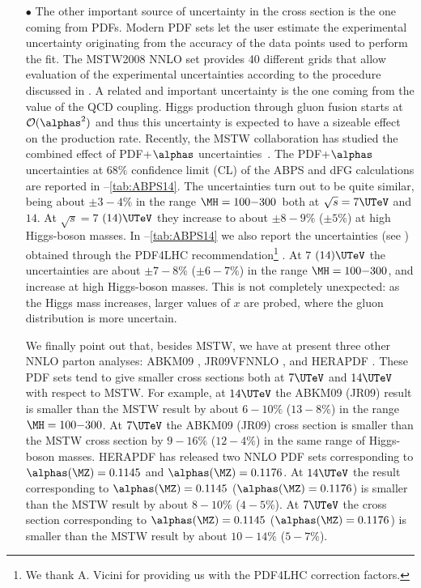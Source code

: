 \begin{itemize}
\item[$\bullet$] The other important source of uncertainty in the cross section is
the one coming from PDFs.
Modern PDF sets let the user estimate the experimental uncertainty
originating from the accuracy of the data points used to perform the fit.
The MSTW2008 NNLO set \cite{Martin:2009iq} provides 40 different grids that allow evaluation of the experimental uncertainties according
to the procedure discussed in .
A related and important uncertainty is the one coming from the value of the QCD coupling.
Higgs production through gluon fusion starts at ${\cal O}(\alphas^2)$ and thus
this uncertainty is expected to have a sizeable effect on the production rate.  
Recently, the MSTW collaboration has studied the combined effect of PDF+$\alphas$
uncertainties~\cite{Martin:2009bu}.
The PDF+$\alphas$ uncertainties at $68\%$ confidence limit (CL) of the ABPS and dFG calculations are
reported in --\ref{tab:ABPS14}.
The uncertainties turn out to be quite similar,
being about $\pm 3{-}4\%$ in the range $\MH=100{-}300$\UGeV\ both at $\sqrt{s}=7\UTeV$ and $14$\UTeV. At $\sqrt{s}=7$ $(14)\UTeV$ they
increase to about $\pm 8{-}9\%$ ($\pm 5\%$) at high Higgs-boson masses.
In --\ref{tab:ABPS14} we also report the
uncertainties (see ) obtained through the PDF4LHC recommendation\footnote{We thank A. Vicini for providing us with the PDF4LHC correction factors.} \cite{PDF4LHCwebpage}.
At $7$ $(14)\UTeV$ the uncertainties are about $\pm 7{-}8\%$ ($\pm 6{-}7\%$) in the range $\MH=100{-}300$\UGeV,
and increase at high Higgs-boson masses. This is not completely unexpected: as the Higgs mass increases,
larger values of $x$ are probed, where the gluon distribution is more uncertain.

We finally point out that, besides MSTW, we have at present three other
NNLO parton analyses: ABKM09 \cite{Alekhin:2009ni}, JR09VFNNLO
\cite{JimenezDelgado:2009tv}, and HERAPDF \cite{CooperSarkar:2010ik}. These PDF sets tend to give smaller cross sections
both at $7\UTeV$ and $14\UTeV$ with respect to MSTW.
For example, at $14\UTeV$
the ABKM09 (JR09) result is smaller than the MSTW result by about $6{-}10\%$ ($13{-}8\%$)
in the range $\MH=100{-}300$\UGeV.
At $7\UTeV$ the ABKM09 (JR09) cross section is smaller than the MSTW cross section
by $9{-}16\%$ ($12{-}4\%$) in the same range of Higgs-boson masses.
HERAPDF has released two NNLO PDF sets corresponding to $\alphas(\MZ)=0.1145$ and $\alphas(\MZ)=0.1176$.
At $14\UTeV$ the result corresponding to $\alphas(\MZ)=0.1145$ ($\alphas(\MZ)=0.1176$)
is smaller than the MSTW result by about $8{-}10\%$ ($4{-}5\%$).
At $7\UTeV$ the cross section corresponding to $\alphas(\MZ)=0.1145$ ($\alphas(\MZ)=0.1176$)
is smaller than the MSTW result by about $10{-}14\%$ ($5{-}7\%$).


\end{itemize}

